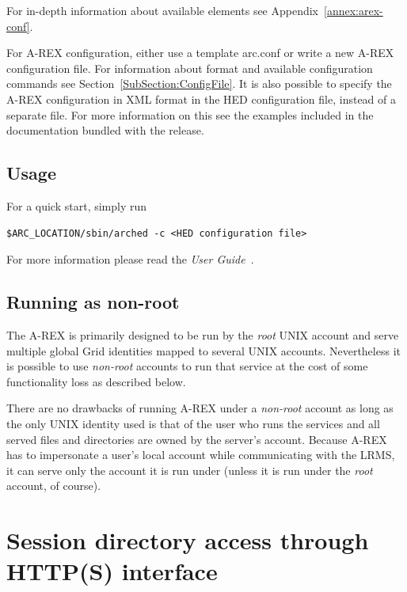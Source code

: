 \documentclass{article}                            %
\begin{document}
For in-depth information about available elements see Appendix~\ref{annex:arex-conf}. 

For A-REX configuration, either use a template arc.conf or write a new
A-REX configuration file.  For information about format and available
configuration commands see Section~\ref{SubSection:ConfigFile}. It is
also possible to specify the A-REX configuration in XML format in the
HED configuration file, instead of a separate file. For more
information on this see the examples included in the documentation
bundled with the release.


\subsection{Usage}

For a quick start, simply run

\begin{shaded}
\begin{verbatim}
$ARC_LOCATION/sbin/arched -c <HED configuration file>
\end{verbatim}
\end{shaded}

For more information please read the \emph{User Guide}~\cite{userguide1}.

\subsection{Running as non-root}

The A-REX is primarily designed to be run by the \emph{root} UNIX
account and serve multiple global Grid identities mapped to several
UNIX accounts. Nevertheless it is possible to use \emph{non-root}
accounts to run that service at the cost of some functionality loss
as described below.

There are no drawbacks of running A-REX under a \emph{non-root} account
as long as the only UNIX identity used is that of the user who runs
the services and all served files and directories are owned by the
server's account. Because A-REX has to impersonate a user's local
account while communicating with the LRMS, it can serve only the account
it is run under (unless it is run under the \emph{root} account, of
course).

\appendix

\section{Session directory access through HTTP(S) interface\label{annex:a}}
\end{document}
